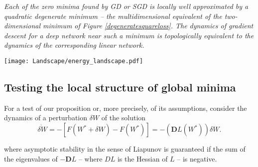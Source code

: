 \documentclass[10pt]{article}
\begin{document}
{\it Each of the zero minima found by GD or SGD is locally well
  approximated by a quadratic degenerate minimum -- the
  multidimensional equivalent of the two-dimensional minimum of Figure
  \ref{degeneratesquareloss}. The dynamics of gradient descent for a
  deep network near such a minimum is topologically equivalent to the
  dynamics of the corresponding linear network. }


\begin{figure*}[h!]\centering
\texttt{[image: Landscape/energy\_landscape.pdf]}
\caption{\it An illustration of a quadratic loss function which is
  locally quadratic near the minimum in the two parameters $w_1$ and
  $w_2$. The minimum has a degenerate Hessian with a zero
  eigenvalue. In the proposition described in the text, this figure
  represents the ``generic'' situation in a small neighborhood of each
  of the zero minimizers with many zero eigenvalues -- and a few
  positive eigenvalues -- of the Hessian of a nonlinear multilayer
  network. In multilayer networks the loss function is likely to be a
  fractal-like hypersurface with many degenerate global minima, each
  locally similar to a multidimensional version of the degenerate
  minimum shown here. For the crossentropy loss, the degenerate
  valley, instead of being flat, is slightly sloped downwards for
  $||w|| \to \infty$. }
\label{degeneratesquareloss}
\end{figure*}





\subsection{Testing the local structure of global minima}


For a test of our proposition or, more precisely, of its assumptions,
consider the dynamics of a perturbation
$\delta W$ of the solution
\begin{equation}
\dot{\delta W} =-  [F(W^*+\delta W) -F(W^*)] =-(  \mathbf{D} L(W^{*})) \delta W.
\label{linearization}
\end{equation}

\noindent where asymptotic stability in the sense of Liapunov is guaranteed if the sum of the
eigenvalues of $- \mathbf{D} L $ -- where $D L$ is the Hessian of $L$ --
is negative.
\end{document}
